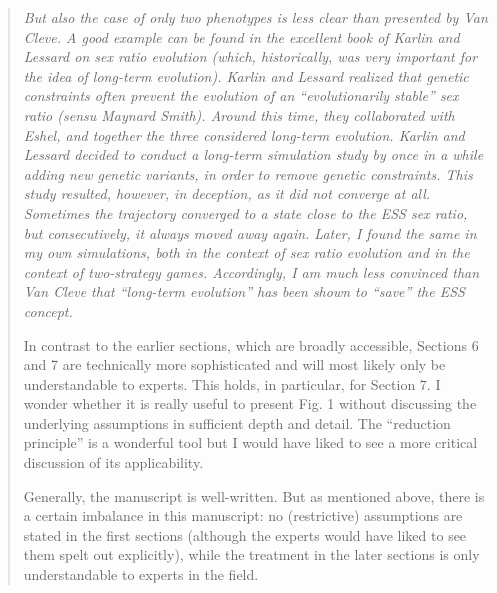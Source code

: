 \documentclass[10pt,parskip=full,foldmarks=off,addrfield=off,backaddress=false,refline=dateleft,letterpaper]{scrlttr2}
\newenvironment{reviewerquote}{\begin{quote}\color{DarkBlue}\itshape}{\end{quote}}
\begin{document}
\begin{letter}
\begin{reviewerquote}
But also the case of only two phenotypes is less clear than presented by Van Cleve. A good example can be found in the excellent book of Karlin and Lessard on sex ratio evolution (which, historically, was very important for the idea of long-term evolution). Karlin and Lessard realized that genetic constraints often prevent the evolution of an “evolutionarily stable” sex ratio (sensu Maynard Smith). Around this time, they collaborated with Eshel, and together the three considered long-term evolution. Karlin and Lessard decided to conduct a long-term simulation study by once in a while adding new genetic variants, in order to remove genetic constraints. This study resulted, however, in deception, as it did not converge at all. Sometimes the trajectory converged to a state close to the ESS sex ratio, but consecutively, it always moved away again. Later, I found the same in my own simulations, both in the context of sex ratio evolution and in the context of two-strategy games. Accordingly, I am much less convinced than Van Cleve that “long-term evolution” has been shown to “save” the ESS concept.

In contrast to the earlier sections, which are broadly accessible, Sections 6 and 7 are technically more sophisticated and will most likely only be understandable to experts. This holds, in particular, for Section 7. I wonder whether it is really useful to present Fig. 1 without discussing the underlying assumptions in sufficient depth and detail. The “reduction principle” is a wonderful tool but I would have liked to see a more critical discussion of its applicability.

Generally, the manuscript is well-written. But as mentioned above, there is a certain imbalance in this manuscript: no (restrictive) assumptions are stated in the first sections (although the experts would have liked to see them spelt out explicitly), while the treatment in the later sections is only understandable to experts in the field.

\end{reviewerquote}



\end{letter}
\end{document}
